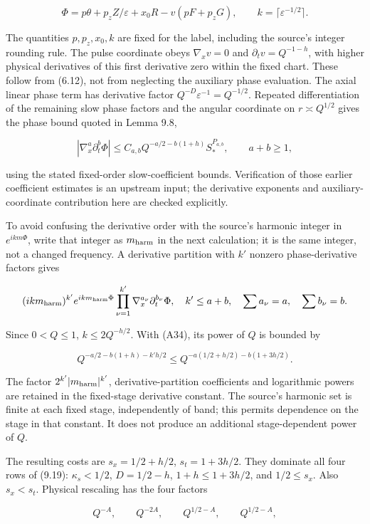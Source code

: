 \documentclass[10pt,a4paper]{article}
\begin{document}
\[
\Phi=p\theta+p_zZ/\varepsilon+x_0R-v(pF+p_zG),\qquad
k=\lceil\varepsilon^{-1/2}\rceil.
\tag{A33}
\]

The quantities \(p,p_z,x_0,k\) are fixed for the label, including the source's integer rounding rule. The pulse coordinate obeys \(\nabla_xv=0\) and \(\partial_tv=Q^{-1-h}\), with higher physical derivatives of this first derivative zero within the fixed chart. These follow from (6.12), not from neglecting the auxiliary phase evaluation. The axial linear phase term has derivative factor \(Q^{-D}\varepsilon^{-1}=Q^{-1/2}\). Repeated differentiation of the remaining slow phase factors and the angular coordinate on \(r\asymp Q^{1/2}\) gives the phase bound quoted in Lemma 9.8,

\[
|\nabla_x^a\partial_t^b\Phi|
\le C_{a,b}Q^{-a/2-b(1+h)}S_*^{P_{a,b}},\qquad a+b\ge1,
\tag{A34}
\]

using the stated fixed-order slow-coefficient bounds. Verification of those earlier coefficient estimates is an upstream input; the derivative exponents and auxiliary-coordinate contribution here are checked explicitly.

To avoid confusing the derivative order with the source's harmonic integer in \(e^{ikm\Phi}\), write that integer as \(m_{\rm harm}\) in the next calculation; it is the same integer, not a changed frequency. A derivative partition with \(k'\) nonzero phase-derivative factors gives

\[
(ikm_{\rm harm})^{k'}e^{ikm_{\rm harm}\Phi}
\prod_{\nu=1}^{k'}\nabla_x^{a_\nu}\partial_t^{b_\nu}\Phi,
\quad k'\le a+b,\quad\sum a_\nu=a,\quad\sum b_\nu=b.
\]

Since \(0<Q\le1\), \(k\le2Q^{-h/2}\). With (A34), its power of \(Q\) is bounded by

\[
Q^{-a/2-b(1+h)-k'h/2}
\le Q^{-a(1/2+h/2)-b(1+3h/2)}.
\tag{A35}
\]

The factor \(2^{k'}|m_{\rm harm}|^{k'}\), derivative-partition coefficients and logarithmic powers are retained in the fixed-stage derivative constant. The source's harmonic set is finite at each fixed stage, independently of band; this permits dependence on the stage in that constant. It does not produce an additional stage-dependent power of \(Q\).

The resulting costs are \(s_x=1/2+h/2\), \(s_t=1+3h/2\). They dominate all four rows of (9.19): \(\kappa_s<1/2\), \(D=1/2-h\), \(1+h\le1+3h/2\), and \(1/2\le s_x\). Also \(s_x<s_t\). Physical rescaling has the four factors

\[
Q^{-A},\qquad Q^{-2A},\qquad Q^{1/2-A},\qquad Q^{1/2-A},
\]
\end{document}
